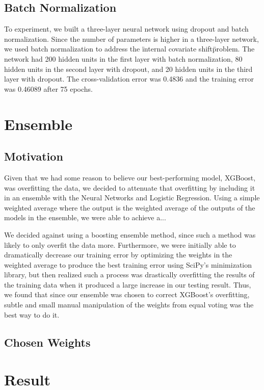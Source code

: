 \documentclass[twoside,11pt]{article}
\theoremstyle{definition}
\begin{document}
\subsection{Batch Normalization}
To experiment, we built a three-layer neural network using dropout and batch normalization. Since the number of parameters is higher in a three-layer network, we used batch normalization to address the \"internal covariate shift\" problem. \cite{Batch_normalization} The network had 200 hidden units in the first layer with batch normalization, 80 hidden units in the second layer with dropout, and 20 hidden units in the third layer with dropout. The cross-validation error was 0.4836 and the training error was 0.46089 after 75 epochs. 

\section{Ensemble}
  \subsection{Motivation}
  Given that we had some reason to believe our best-performing model, XGBoost, was overfitting the data, we decided to attenuate that overfitting by including it in an ensemble with the Neural Networks and Logistic Regression. Using a simple weighted average where the output is the weighted average of the outputs of the models in the ensemble, we were able to achieve a...

  We decided against using a boosting ensemble method, since such a method was likely to only overfit the data more. Furthermore, we were initially able to dramatically decrease our training error by optimizing the weights in the weighted average to produce the best training error using SciPy's minimization library, but then realized such a process was drastically overfitting the results of the training data when it produced a large increase in our testing result. Thus, we found that since our ensemble was chosen to correct XGBoost's overfitting, subtle and small manual manipulation of the weights from equal voting was the best way to do it.

  \subsection{Chosen Weights}

\section{Result}
\end{document}
